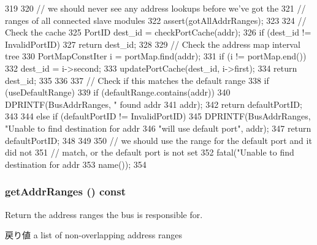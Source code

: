 \begin{DoxyCode}
319 {
320     // we should never see any address lookups before we've got the
321     // ranges of all connected slave modules
322     assert(gotAllAddrRanges);
323 
324     // Check the cache
325     PortID dest_id = checkPortCache(addr);
326     if (dest_id != InvalidPortID)
327         return dest_id;
328 
329     // Check the address map interval tree
330     PortMapConstIter i = portMap.find(addr);
331     if (i != portMap.end()) {
332         dest_id = i->second;
333         updatePortCache(dest_id, i->first);
334         return dest_id;
335     }
336 
337     // Check if this matches the default range
338     if (useDefaultRange) {
339         if (defaultRange.contains(addr)) {
340             DPRINTF(BusAddrRanges, "  found addr %
341                     addr);
342             return defaultPortID;
343         }
344     } else if (defaultPortID != InvalidPortID) {
345         DPRINTF(BusAddrRanges, "Unable to find destination for addr %
346                 "will use default port\n", addr);
347         return defaultPortID;
348     }
349 
350     // we should use the range for the default port and it did not
351     // match, or the default port is not set
352     fatal("Unable to find destination for addr %
353           name());
354 }
\end{DoxyCode}
\hypertarget{classBaseBus_a36cf113d5e5e091ebddb32306c098fae}{
\subsubsection[{getAddrRanges}]{ getAddrRanges () const}}
\label{classBaseBus_a36cf113d5e5e091ebddb32306c098fae}
Return the address ranges the bus is responsible for.

\begin{DoxyReturn}{戻り値}
a list of non-\/overlapping address ranges 
\end{DoxyReturn}



